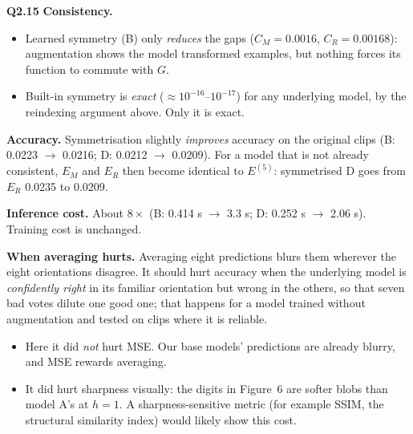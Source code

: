 \documentclass[11pt]{article}
\newcommand{\q}[1]{\par\medskip\noindent\textbf{#1}\quad}
\begin{document}
\q{Q2.15}
\textbf{Consistency.}
\begin{itemize}
  \item Learned symmetry (B) only \emph{reduces} the gaps ($C_M=0.0016$, $C_R=0.00168$): augmentation shows the model transformed examples, but nothing forces its function to commute with $G$.
  \item Built-in symmetry is \emph{exact} ($\approx10^{-16}$--$10^{-17}$) for any underlying model, by the reindexing argument above. Only it is exact.
\end{itemize}
\textbf{Accuracy.} Symmetrisation slightly \emph{improves} accuracy on the original clips (B: 0.0223 $\to$ 0.0216; D: 0.0212 $\to$ 0.0209). For a model that is not already consistent, $E_M$ and $E_R$ then become identical to $E^{(5)}$: symmetrised D goes from $E_R$ 0.0235 to 0.0209.

\textbf{Inference cost.} About $8\times$ (B: 0.414 s $\to$ 3.3 s; D: 0.252 s $\to$ 2.06 s). Training cost is unchanged.

\textbf{When averaging hurts.} Averaging eight predictions blurs them wherever the eight orientations disagree. It should hurt accuracy when the underlying model is \emph{confidently right} in its familiar orientation but wrong in the others, so that seven bad votes dilute one good one; that happens for a model trained without augmentation and tested on clips where it is reliable.
\begin{itemize}
  \item Here it did \emph{not} hurt MSE. Our base models' predictions are already blurry, and MSE rewards averaging.
  \item It did hurt sharpness visually: the digits in Figure~6 are softer blobs than model A's at $h=1$. A sharpness-sensitive metric (for example SSIM, the structural similarity index) would likely show this cost.
\end{itemize}
\end{document}
